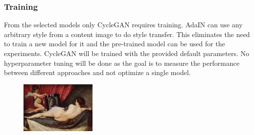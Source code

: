 \documentclass[conference]{IEEEtran}
\begin{document}
\subsubsection{Training}
From the selected models only CycleGAN requires training.
AdaIN can use any arbitrary style from a content image to do style transfer.
This eliminates the need to train a new model for it and the pre-trained model can be used for the experiments.
CycleGAN will be trained with the provided default parameters.
No hyperparameter tuning will be done as the goal is to measure the performance between different approaches and not optimize a single model.

\begin{figure}[t]
	\centering
	 {
		\includegraphics[height=1in]{22_22_diego-velazquez_the-rokeby-venus-1648}
}
\end{figure}
\end{document}
